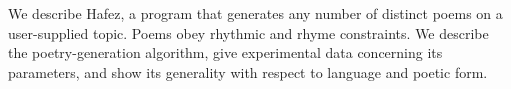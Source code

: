 We describe Hafez, a program that generates any number of distinct poems on a user-supplied topic.  Poems obey rhythmic and rhyme constraints.  We describe the poetry-generation algorithm, give experimental data concerning its parameters, and show its generality with respect to language and poetic form.
